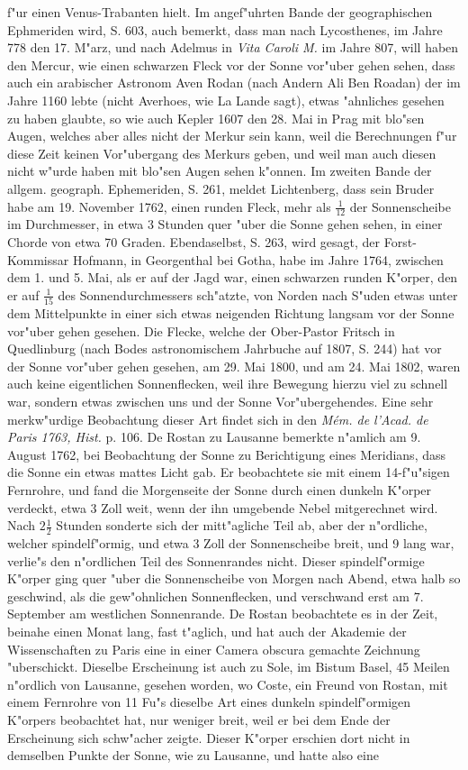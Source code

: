 \documentclass[a4paper, 11pt, oneside, polutonikogreek, german]{article}
\begin{document}
f"ur einen Venus-Trabanten hielt. Im angef"uhrten Bande der geographischen Ephmeriden wird, S. 603, auch bemerkt, dass man nach Lycosthenes, im Jahre 778 den 17. M"arz, und nach Adelmus in \emph{Vita Caroli M.} im Jahre 807, will haben den Mercur, wie einen schwarzen Fleck vor der Sonne vor"uber gehen sehen, dass auch ein arabischer Astronom Aven Rodan (nach Andern Ali Ben Roadan) der im Jahre 1160 lebte (nicht Averhoes, wie La Lande sagt), etwas "ahnliches gesehen zu haben glaubte, so wie auch Kepler 1607 den 28. Mai in Prag mit blo"sen Augen, welches aber alles nicht der Merkur sein kann, weil die Berechnungen f"ur diese Zeit keinen Vor"ubergang des Merkurs geben, und weil man auch diesen nicht w"urde haben mit blo"sen Augen sehen k"onnen. Im zweiten Bande der allgem. geograph. Ephemeriden, S. 261, meldet Lichtenberg, dass sein Bruder habe am 19. November 1762, einen runden Fleck, mehr als $\mathfrak{\frac{1}{12}}$ der Sonnenscheibe im Durchmesser, in etwa 3 Stunden quer "uber die Sonne gehen sehen, in einer Chorde von etwa 70 Graden. Ebendaselbst, S. 263, wird gesagt, der Forst-Kommissar Hofmann, in Georgenthal bei Gotha, habe im Jahre 1764, zwischen dem 1. und 5. Mai, als er auf der Jagd war, einen schwarzen runden K"orper, den er auf $\mathfrak{\frac{1}{15}}$ des Sonnendurchmessers sch"atzte, von Norden nach S"uden etwas unter dem Mittelpunkte in einer sich etwas neigenden Richtung langsam vor der Sonne vor"uber gehen gesehen. Die Flecke, welche der Ober-Pastor Fritsch in Quedlinburg (nach Bodes astronomischem Jahrbuche auf 1807, S. 244) hat vor der Sonne vor"uber gehen gesehen, am 29. Mai 1800, und am 24. Mai 1802, waren auch keine eigentlichen Sonnenflecken, weil ihre Bewegung hierzu viel zu schnell war, sondern etwas zwischen uns und der Sonne Vor"ubergehendes. Eine sehr merkw"urdige Beobachtung dieser Art findet sich in den \emph{Mém. de l'Acad. de Paris 1763, Hist.} p. 106. De Rostan zu Lausanne bemerkte n"amlich am 9. August 1762, bei Beobachtung der Sonne zu Berichtigung eines Meridians, dass die Sonne ein etwas mattes Licht gab. Er beobachtete sie mit einem 14-f"u"sigen Fernrohre, und fand die Morgenseite der Sonne durch einen dunkeln K"orper verdeckt, etwa 3 Zoll weit, wenn der ihn umgebende Nebel mitgerechnet wird. Nach $\mathfrak{2\frac{1}{2}}$ Stunden sonderte sich der mitt"agliche Teil ab, aber der n"ordliche, welcher spindelf"ormig, und etwa 3 Zoll der Sonnenscheibe breit, und 9 lang war, verlie"s den n"ordlichen Teil des Sonnenrandes nicht. Dieser spindelf"ormige K"orper ging quer "uber die Sonnenscheibe von Morgen nach Abend, etwa halb so geschwind, als die gew"ohnlichen Sonnenflecken, und verschwand erst am 7. September am westlichen Sonnenrande. De Rostan beobachtete es in der Zeit, beinahe einen Monat lang, fast t"aglich, und hat auch der Akademie der Wissenschaften zu Paris eine in einer Camera obscura gemachte Zeichnung "uberschickt. Dieselbe Erscheinung ist auch zu Sole, im Bistum Basel, 45 Meilen n"ordlich von Lausanne, gesehen worden, wo Coste, ein Freund von Rostan, mit einem Fernrohre von 11 Fu"s dieselbe Art eines dunkeln spindelf"ormigen K"orpers beobachtet hat, nur weniger breit, weil er bei dem Ende der Erscheinung sich schw"acher zeigte. Dieser K"orper erschien dort nicht in demselben Punkte der Sonne, wie zu Lausanne, und hatte also eine 
\end{document}
